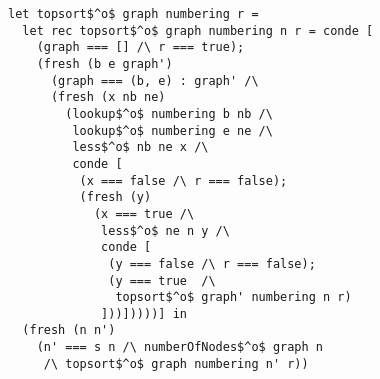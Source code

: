 \begin{figure}[!t]
  \centering
  \begin{minipage}{0.49\textwidth}
    \begin{lstlisting}[label={topsort_rel}, caption={Relational intepreter for topologic sort of a graph}, captionpos=b, frame=tb]
let topsort$^o$ graph numbering r =
  let rec topsort$^o$ graph numbering n r = conde [
    (graph === [] /\ r === true);
    (fresh (b e graph')
      (graph === (b, e) : graph' /\
      (fresh (x nb ne)
        (lookup$^o$ numbering b nb /\
         lookup$^o$ numbering e ne /\
         less$^o$ nb ne x /\
         conde [
          (x === false /\ r === false);
          (fresh (y)
            (x === true /\
             less$^o$ ne n y /\
             conde [
              (y === false /\ r === false);
              (y === true  /\
               topsort$^o$ graph' numbering n r)
             ]))]))))] in
  (fresh (n n')
    (n' === s n /\ numberOfNodes$^o$ graph n
     /\ topsort$^o$ graph numbering n' r))
    \end{lstlisting}
  \end{minipage}
\end{figure}
